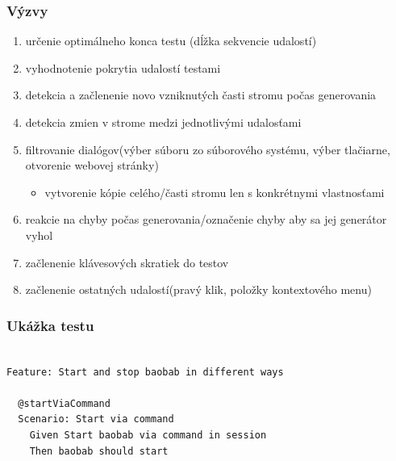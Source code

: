 \documentclass[10pt,xcolor=pdflatex,hyperref={unicode}]{beamer}
\begin{document}
\begin{frame}\frametitle{Výzvy}
    \begin{enumerate}
        \item určenie optimálneho konca testu (dĺžka sekvencie udalostí)
        \item vyhodnotenie pokrytia udalostí testami
        \item detekcia a začlenenie novo vzniknutých časti stromu počas generovania
        \item detekcia zmien v strome medzi jednotlivými udalosťami
        \item filtrovanie dialógov(výber súboru zo súborového systému, výber tlačiarne, otvorenie webovej stránky)
        \begin{itemize}
            \item vytvorenie kópie celého/časti stromu len s konkrétnymi vlastnosťami 
        \end{itemize}
        \item reakcie na chyby počas generovania/označenie chyby aby sa jej generátor vyhol
        \item začlenenie klávesových skratiek do testov
        \item začlenenie ostatných udalostí(pravý klik, položky kontextového menu)
    \end{enumerate}
\end{frame}

\begin{frame}[fragile]\frametitle{Ukážka testu}

\begin{lstlisting}[language=Gherkin]

Feature: Start and stop baobab in different ways

  @startViaCommand
  Scenario: Start via command
    Given Start baobab via command in session
    Then baobab should start
\end{lstlisting}
\begin{figure}[h]
    \label{diagram}
\end{figure}

\end{frame}


\end{document}

